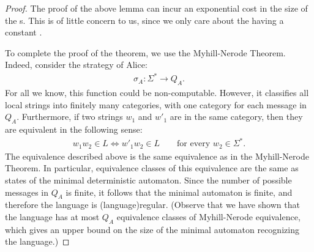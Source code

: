 \begin{proof}
The proof of the above lemma can incur an exponential cost in the size of the s. This is of little concern to us, since we only care about the  having a constant .

  To complete the proof of the theorem, we use the  Myhill-Nerode Theorem.  Indeed, consider the strategy of  Alice: 
  \begin{align*}
  \sigma_A : \Sigma^* \to Q_A.
  \end{align*}
  For all we know, this function could be non-computable. However, it classifies all local strings into finitely many categories, with one category for each message in $Q_A$. Furthermore, if two strings $w_1$ and $w'_1$ are in the same category, then they are equivalent in the following sense: 
  \begin{align}\label{eq:myhill-nerode-equivalence}
  w_1 w_2 \in L \Leftrightarrow w'_1 w_2 \in L 
  \qquad \text{for every $w_2 \in \Sigma^*$.}
  \end{align}
  The equivalence described above is the same equivalence as in the Myhill-Nerode Theorem. In particular, equivalence classes of this equivalence are the same as states of the minimal deterministic automaton. Since the number of possible messages in $Q_A$ is finite, it follows that the minimal automaton is finite, and therefore the language is \kl(language){regular}.  (Observe that we have shown that the language has at most $Q_A$ equivalence classes of Myhill-Nerode equivalence, which gives an upper bound on the size of the minimal automaton recognizing the language.)
\end{proof}

